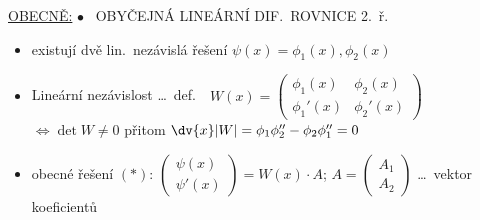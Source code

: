 \underline{OBECNĚ:} $\bullet$ \ OBYČEJNÁ LINEÁRNÍ DIF.\ ROVNICE 2.\ ř.
\begin{itemize}[nosep]
  \item[$\to$] existují dvě lin.\ nezávislá řešení $\psi(x) = \phi_1(x), \phi_2(x)$
  \item[$\to$] Lineární nezávislost \dots\ def.\ \
        $W(x) = \begin{pmatrix}\phi_1(x) & \phi_2(x)\\ \phi_1'(x) & \phi_2'(x)\end{pmatrix}$ \\
        $\Leftrightarrow \det W \neq 0$ \quad přitom \quad $\dv{x}|W| = \phi_1\phi_2'' - \phi_2\phi_1'' = 0$ \quad {}
  \item[$\to$] obecné řešení $(*)$: \quad
        $\begin{pmatrix}\psi(x)\\ \psi'(x)\end{pmatrix} = W(x)\cdot A$; \quad
        $A = \begin{pmatrix}A_1\\ A_2\end{pmatrix}$ \dots\ vektor koeficientů
\end{itemize}

